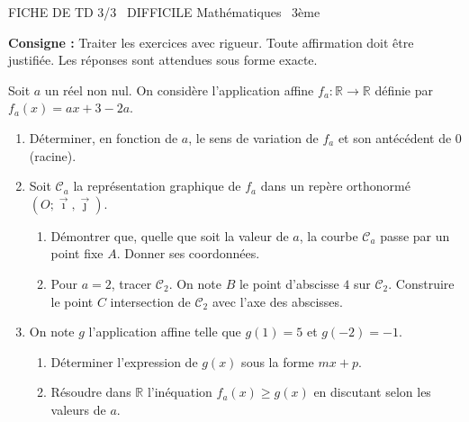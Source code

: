 \documentclass[11pt]{article}
\begin{document}
\begin{tcolorbox}[enhanced,colback=popink,colframe=popink,arc=10pt,boxrule=0pt,left=12pt,right=12pt,top=9pt,bottom=9pt]
{\color{white}\popxbold\small FICHE DE TD 3/3 \textbullet\ DIFFICILE \hfill Mathématiques \textbullet\ 3ème\par}
\end{tcolorbox}
\vspace{4pt}
\noindent\textbf{Consigne :} Traiter les exercices avec rigueur. Toute affirmation doit être justifiée. Les réponses sont attendues sous forme exacte.

\begin{exercice}
Soit $a$ un réel non nul. On considère l'application affine $f_a : \mathbb{R} \to \mathbb{R}$ définie par $f_a(x) = ax + 3 - 2a$.
\begin{enumerate}
    \item Déterminer, en fonction de $a$, le sens de variation de $f_a$ et son antécédent de $0$ (racine).
    \item Soit $\mathcal{C}_a$ la représentation graphique de $f_a$ dans un repère orthonormé $(O;\vec{\imath},\vec{\jmath})$.
    \begin{enumerate}
        \item Démontrer que, quelle que soit la valeur de $a$, la courbe $\mathcal{C}_a$ passe par un point fixe $A$. Donner ses coordonnées.
        \item Pour $a=2$, tracer $\mathcal{C}_2$. On note $B$ le point d'abscisse $4$ sur $\mathcal{C}_2$. Construire le point $C$ intersection de $\mathcal{C}_2$ avec l'axe des abscisses.
    \end{enumerate}
    \item On note $g$ l'application affine telle que $g(1)=5$ et $g(-2)=-1$.
    \begin{enumerate}
        \item Déterminer l'expression de $g(x)$ sous la forme $mx+p$.
        \item Résoudre dans $\mathbb{R}$ l'inéquation $f_a(x) \ge g(x)$ en discutant selon les valeurs de $a$.
    \end{enumerate}
\end{enumerate}
\end{exercice}
\end{document}
